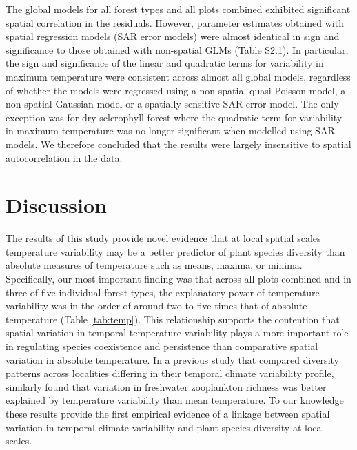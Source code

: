 The global models for all forest types and all plots combined exhibited significant spatial correlation in the residuals. However, parameter estimates obtained with spatial regression models (SAR error models) were almost identical in sign and significance to those obtained with non-spatial GLMs (Table S2.1). In particular, the sign and significance of the linear and quadratic terms for variability in maximum temperature were consistent across almost all global models, regardless of whether the models were regressed using a non-spatial quasi-Poisson model, a non-spatial Gaussian model or a spatially sensitive SAR error model. The only exception was for dry sclerophyll forest where the quadratic term for variability in maximum temperature was no longer significant when modelled using SAR models. We therefore concluded that the results were largely insensitive to spatial autocorrelation in the data.


\section{Discussion}

The results of this study provide novel evidence that at local spatial scales temperature variability may be a better predictor of plant species diversity than absolute measures of temperature such as means, maxima, or minima. Specifically, our most important finding was that across all plots combined and in three of five individual forest types, the explanatory power of temperature variability was in the order of around two to five times that of absolute temperature (Table \ref{tab:temp}). This relationship supports the contention that spatial variation in temporal temperature variability plays a more important role in regulating species coexistence and persistence than comparative spatial variation in absolute temperature. In a previous study that compared diversity patterns across localities differing in their temporal climate variability profile, \citet{Shurin2010} similarly found that variation in freshwater zooplankton richness was better explained by temperature variability than mean temperature. To our knowledge these results provide the first empirical evidence of a linkage between spatial variation in temporal climate variability and plant species diversity at local scales.


